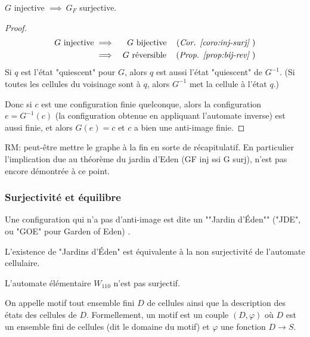 \begin{coro}
	$G$ injective $\implies \ G_F$ surjective.
\end{coro}


\begin{proof}
	\begin{eqnarray*}
		G \text{ injective} &\implies& G \text{ bijective} \quad\left(\textit{Cor. \ref{coro:inj-surj} }\right)\\
		&\implies& G \text{ réversible} \quad\left(\textit{Prop. \ref{prop:bij-rev} }\right)
	\end{eqnarray*}
	Si $q$ est l'état "quiescent" pour $G$, alors $q$ est aussi l'état "quiescent" de $G^{-1}$.
	(Si toutes les cellules du voisinage sont à $q$, alors $G^{-1}$ met la cellule à l'état $q$.)

	Donc si $c$ est une configuration finie quelconque,  alors la configuration $e = G^{-1}(c)$ (la configuration obtenue en appliquant
	l'automate inverse) est aussi finie, et alors $G(e) = c$ et $c$ a bien une anti-image finie.
\end{proof}

RM: peut-être mettre le graphe à la fin en sorte de récapitulatif. En particulier l'implication due au  théorème du jardin
d'Eden (GF inj ssi  G surj), n'est pas encore démontrée à ce point.


\subsubsection{Surjectivité et équilibre}
\begin{definition}
	Une configuration qui n'a pas d'anti-image est dite un ""Jardin d'Éden"" ("JDE", ou "GOE" pour Garden of Eden) .
\end{definition}

\begin{remarque}
	L'existence de "Jardins d'Éden" est équivalente à la non surjectivité de l'automate cellulaire.
\end{remarque}

\begin{exemple}
	L'automate élémentaire $W_{110}$ n'est pas surjectif.
	\todo{~}
\end{exemple}


\begin{definition}
	On appelle motif tout ensemble fini $D$ de cellules ainsi que la description des états des cellules de $D$. Formellement, un motif est un
	couple $(D, \varphi)$ où $D$ est un ensemble fini de cellules (dit le domaine du motif) et $\varphi$ une fonction $D \to S$.
\end{definition}


